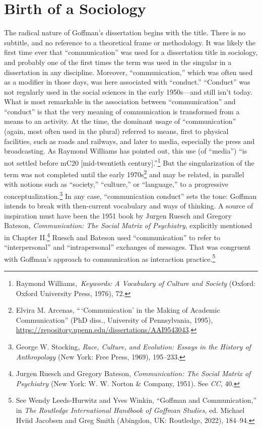 \documentclass[openany,nobib]{tufte-book}
\begin{document}
\hypertarget{birth-of-a-sociology}{%
\section{Birth of a Sociology}\label{birth-of-a-sociology}}

The radical nature of Goffman's dissertation begins with the title.
There is no subtitle, and no reference to a theoretical frame or
methodology. It was likely the first time ever that ``communication''
was used for a dissertation title in sociology, and probably one of the
first times the term was used in the singular in a dissertation in any
discipline. Moreover, ``communication,'' which was often used as a
modifier in those days, was here associated with ``conduct.''
``Conduct'' was not regularly used in the social sciences in the early
1950s---and still isn't today. What is most remarkable in the
association between ``communication'' and ``conduct'' is that the very
meaning of communication is transformed from a means to an activity. At
the time, the dominant usage of ``communication'' (again, most often
used in the plural) referred to means, first to physical facilities,
such as roads and railways, and later to media, especially the press and
broadcasting. As Raymond Williams has pointed out, this use (of
``media'') ``is not settled before mC20 {[}mid-twentieth
century{]}.''\footnote{Raymond Williams,~\emph{Keywords: A Vocabulary of
  Culture and Society} (Oxford: Oxford University Press, 1976), 72.} But
the singularization of the term was not completed until the early
1970s\footnote{Elvira M. Arcenas, ``\,`Communication' in the Making of
  Academic Communication'' (PhD diss., University of Pennsylvania,
  1995), \url{https://repository.upenn.edu/dissertations/AAI9543043}.}
and may be related, in parallel with notions such as ``society,''
``culture,'' or ``language,'' to a progressive
conceptualization.\footnote{George W. Stocking, \emph{Race, Culture, and
  Evolution: Essays in the History of Anthropology} (New York: Free
  Press, 1969), 195--233.} In any case, ``communication conduct'' sets
the tone: Goffman intends to break with then-current vocabulary and ways
of thinking. A source of inspiration must have been the 1951 book by
Jurgen Ruesch and Gregory Bateson, \emph{Communication: The Social
Matrix of Psychiatry}, explicitly mentioned in Chapter II.\footnote{Jurgen
  Ruesch and Gregory Bateson, \emph{Communication: The Social Matrix of
  Psychiatry} (New York: W. W. Norton \& Company, 1951). See \emph{CC},
  40.} Ruesch and Bateson used ``communication'' to refer to
``interpersonal'' and ``intrapersonal'' exchanges of messages. That was
congruent with Goffman's approach to communication as interaction
practice.\footnote{See Wendy Leeds-Hurwitz and Yves Winkin, ``Goffman
  and Communication,'' in \emph{The Routledge International Handbook of
  Goffman Studies}, ed. Michael Hviid Jacobsen and Greg Smith (Abingdon,
  UK: Routledge, 2022), 184--94.}
\end{document}
